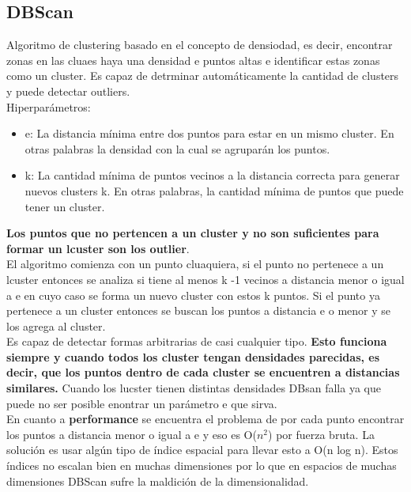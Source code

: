 \documentclass[titlepage,a4paper]{article}
\begin{document}
\subsection*{DBScan}
Algoritmo de clustering basado en el concepto de densiodad, es decir, encontrar zonas en las cluaes haya una densidad e puntos altas e identificar estas zonas como un cluster. Es capaz de detrminar automáticamente la cantidad de clusters y puede detectar outliers. \\

Hiperparámetros: 
\begin{itemize}
\item e: La distancia mínima entre dos puntos para estar en un mismo cluster. En otras palabras la densidad con la cual se agruparán los puntos.
\item k: La cantidad  mínima de puntos vecinos a la distancia correcta para generar nuevos clusters k. En otras palabras, la cantidad mínima de puntos que puede tener un cluster. 
\end{itemize}

\textbf{Los puntos que no pertencen a un cluster y no son suficientes para formar un lcuster son los outlier}.\\

El algoritmo comienza con un punto cluaquiera, si el punto no pertenece a un lcuster entonces se analiza si tiene al menos k -1 vecinos a distancia menor o igual a e en cuyo caso se forma un nuevo cluster con estos k puntos. Si el punto ya pertenece a un cluster entonces se buscan los puntos a distancia e o menor y se los agrega al cluster. \\

Es capaz de detectar formas arbitrarias de casi cualquier tipo. \textbf{Esto funciona siempre y cuando todos los cluster tengan densidades parecidas, es decir, que los puntos dentro de cada cluster se encuentren a distancias similares. }Cuando los lucster tienen distintas densidades DBsan falla ya que puede no ser posible enontrar un parámetro e que sirva. \\

En cuanto a \textbf{performance} se encuentra el problema de por cada punto encontrar los puntos a distancia menor o igual a e y eso es O($n^2$) por fuerza bruta. La solución es usar algún tipo de índice espacial para llevar esto a O(n log n). Estos índices no escalan bien en muchas dimensiones por lo que en espacios de muchas dimensiones DBScan sufre la maldición de la dimensionalidad. \\
\end{document}
